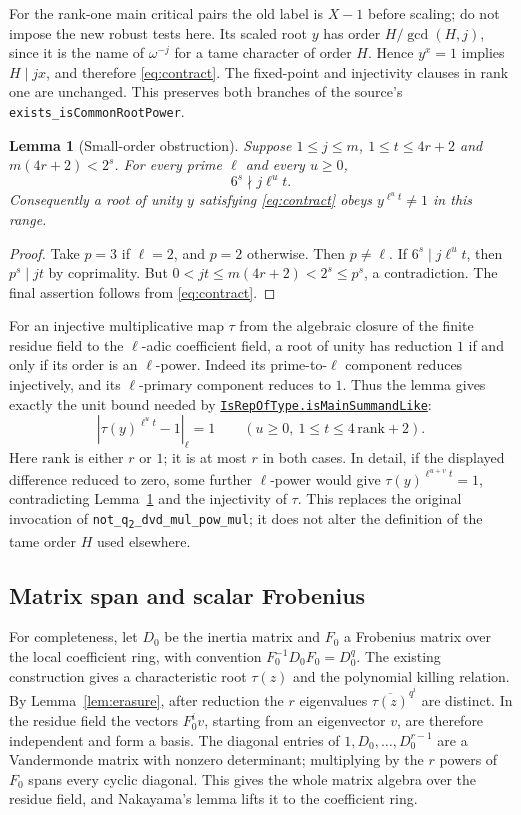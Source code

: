\documentclass[11pt]{article}
\newtheorem{lemma}[theorem]{Lemma}
\theoremstyle{definition}\newtheorem{definition}[theorem]{Definition}
\newcommand{\src}[2]{\href{https://github.com/VladimirReshetnikov/ProveIt/blob/ee10f937fedac0955d28b7b860f4c44fab508204/Analysis/GeneralizedRiemannHypothesis/Lean/grh/src/#1}{\texttt{#2}}}
\begin{document}
For the rank-one main critical pairs the old label is $X-1$ before scaling; do not impose the new robust tests here. Its scaled root $y$ has order $H/\gcd(H,j)$, since it is the name of $\omega^{-j}$ for a tame character of order $H$. Hence $y^x=1$ implies $H\mid jx$, and therefore \eqref{eq:contract}. The fixed-point and injectivity clauses in rank one are unchanged. This preserves both branches of the source's \texttt{exists\_isCommonRootPower}.

\begin{lemma}[Small-order obstruction]\label{lem:scalar}
Suppose $1\le j\le m$, $1\le t\le4r+2$ and $m(4r+2)<2^s$. For every prime $\ell$ and every $u\ge0$,
\[
                    6^s\nmid j\ell^u t.
\]
Consequently a root of unity $y$ satisfying \eqref{eq:contract} obeys $y^{\ell^u t}\ne1$ in this range.
\end{lemma}
\begin{proof}
Take $p=3$ if $\ell=2$, and $p=2$ otherwise. Then $p\ne\ell$. If $6^s\mid j\ell^u t$, then $p^s\mid jt$ by coprimality. But $0<jt\le m(4r+2)<2^s\le p^s$, a contradiction. The final assertion follows from \eqref{eq:contract}.
\end{proof}

For an injective multiplicative map $\tau$ from the algebraic closure of the finite residue field to the $\ell$-adic coefficient field, a root of unity has reduction $1$ if and only if its order is an $\ell$-power. Indeed its prime-to-$\ell$ component reduces injectively, and its $\ell$-primary component reduces to $1$. Thus the lemma gives exactly the unit bound needed by \src{New/Congruences/GaloisRepresentations/RowsAndColumnsFromLabels.lean\#L548}{IsRepOfType.isMainSummandLike}:
\[
              |\tau(y)^{\ell^u t}-1|_\ell=1
 \qquad (u\ge0,\ 1\le t\le4\,\mathrm{rank}+2).
\]
Here $\mathrm{rank}$ is either $r$ or $1$; it is at most $r$ in both cases. In detail, if the displayed difference reduced to zero, some further $\ell$-power would give $\tau(y)^{\ell^{u+v}t}=1$, contradicting Lemma~\ref{lem:scalar} and the injectivity of $\tau$. This replaces the original invocation of \texttt{not\_q\textsubscript{2}\_dvd\_mul\_pow\_mul}; it does not alter the definition of the tame order $H$ used elsewhere.

\subsection{Matrix span and scalar Frobenius}
For completeness, let $D_0$ be the inertia matrix and $F_0$ a Frobenius matrix over the local coefficient ring, with convention $F_0^{-1}D_0F_0=D_0^q$. The existing construction gives a characteristic root $\tau(z)$ and the polynomial killing relation. By Lemma~\ref{lem:erasure}, after reduction the $r$ eigenvalues $\overline{\tau(z)}^{q^i}$ are distinct. In the residue field the vectors $F_0^iv$, starting from an eigenvector $v$, are therefore independent and form a basis. The diagonal entries of $1,D_0,\ldots,D_0^{r-1}$ are a Vandermonde matrix with nonzero determinant; multiplying by the $r$ powers of $F_0$ spans every cyclic diagonal. This gives the whole matrix algebra over the residue field, and Nakayama's lemma lifts it to the coefficient ring.
\end{document}
